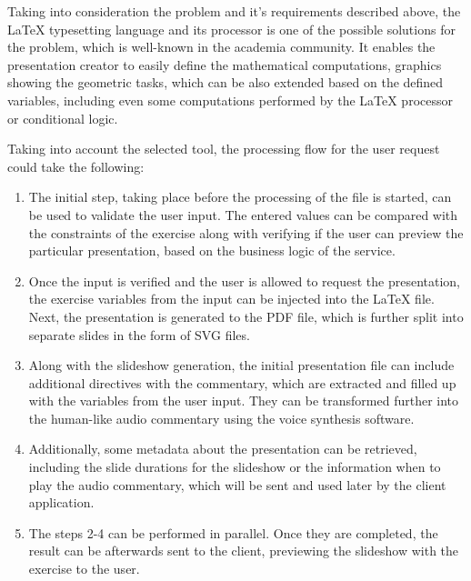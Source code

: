 Taking into consideration the problem and it's requirements described above, the LaTeX \cite{latex} typesetting language and its processor is one of the possible solutions for the problem, which is well-known in the academia community.
It enables the presentation creator to easily define the mathematical computations, graphics showing the geometric tasks, which can be also extended based on the defined variables, including even some computations performed by the LaTeX processor or conditional logic.

Taking into account the selected tool, the processing flow for the user request could take the following:

\begin{enumerate}
   \item The initial step, taking place before the processing of the file is started, can be used to validate the user input. The entered values can be compared with the constraints of the exercise along with verifying if the user can preview the particular presentation, based on the business logic of the service.
   \item Once the input is verified and the user is allowed to request the presentation, the exercise variables from the input can be injected into the LaTeX file. 
Next, the presentation is generated to the PDF file, which is further split into separate slides in the form of SVG files.
   \item Along with the slideshow generation, the initial presentation file can include additional directives with the commentary, which are extracted and filled up with the variables from the user input. They can be transformed further into the human-like audio commentary using the voice synthesis software.
   \item Additionally, some metadata about the presentation can be retrieved, including the slide durations for the slideshow or the information when to play the audio commentary, which will be sent and used later by the client application.
   \item The steps 2-4 can be performed in parallel. Once they are completed, the result can be afterwards sent to the client, previewing the slideshow with the exercise to the user.
\end{enumerate}


